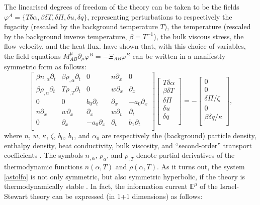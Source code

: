 \documentclass[a4paper, amsfonts, amssymb, amsmath, reprint, showkeys, nofootinbib, twoside, onecolumn,notitlepage]{revtex4-1}
\begin{document}
The linearised degrees of freedom of the theory can be taken to be the fields $\varphi^A=\{T\delta \alpha, \beta\delta T, \delta \Pi,\delta u, \delta q \}$, representing perturbations to respectively the fugacity (rescaled by the background temperature $T$), the temperature (rescaled by the background inverse temperature, $\beta=T^{-1}$), the bulk viscous stress, the flow velocity, and the heat flux. \citet{Hishcock1983} have shown that, with this choice of variables, the field equations $M^\mu_{AB}\partial_\mu \varphi^B=-\Xi_{AB}\varphi^B$ can be written in a manifestly symmetric form as follows:
\begin{equation}\label{astolfo}
\begin{bmatrix}
\beta n_{,\alpha} \partial_t & \beta \rho_{,\alpha} \partial_t & 0 & n\partial_x & 0  \\
 \beta \rho_{,\alpha} \partial_t & T \rho_{,T} \partial_t & 0 & w\partial_x & \partial_x  \\
0 & 0 & b_0 \partial_t & \partial_x & -a_0 \partial_x \\
n \partial_x & w\partial_x & \partial_x & w\partial_t & \partial_t \\
0 & \partial_x & -a_0 \partial_x & \partial_t & b_1 \partial_t \\
\end{bmatrix}
\begin{bmatrix}
T\delta \alpha \\
\beta \delta T \\
\delta \Pi \\
\delta u \\
\delta q \\
\end{bmatrix} =- 
\begin{bmatrix}
0 \\
0 \\
\delta \Pi/\zeta \\
0 \\
\beta\delta q/\kappa \\
\end{bmatrix},
\end{equation} 
where $n$, $w$, $\kappa$, $\zeta$, $b_0$, $b_1$, and $\alpha_0$ are respectively the (background) particle density, enthalpy density, heat conductivity, bulk viscosity, and ``second-order'' transport coefficients \cite{DMNR2012}. The symbols $n_{,\alpha}$, $\rho_\alpha$, and $\rho_{,T}$ denote partial derivatives of the thermodynamic functions $n(\alpha,T)$ and $\rho(\alpha,T)$. As it turns out, the system \eqref{astolfo} is not only symmetric, but also symmetric hyperbolic, if the theory is thermodynamically stable \cite{GavssinoUniversalityI2023,GavssinoUniversalityII2023}. In fact, the information current $\mathbb{E}^\mu$ of the Israel-Stewart theory \cite{GavassinoGibbs2021} can be expressed (in 1+1 dimensions) as follows:
\end{document}
